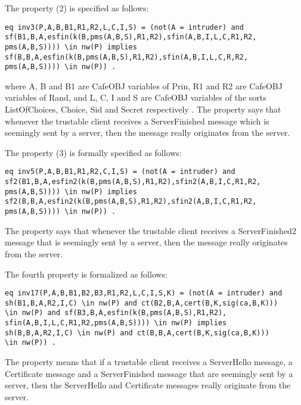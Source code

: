 \documentclass[a4paper,fleqn]{cas-dc}
\begin{document}
The property (2) is specified as follows:
\begin{small}
\begin{verbatim}
eq inv3(P,A,B,B1,R1,R2,L,C,I,S) = (not(A = intruder) and 
sf(B1,B,A,esfin(k(B,pms(A,B,S),R1,R2),sfin(A,B,I,L,C,R1,R2,
pms(A,B,S)))) \in nw(P) implies
sf(B,B,A,esfin(k(B,pms(A,B,S),R1,R2),sfin(A,B,I,L,C,R,R2,
pms(A,B,S)))) \in nw(P)) .
\end{verbatim}
\end{small}
where A, B and B1 are CafeOBJ variables of Prin, R1 and R2 are CafeOBJ variables of Rand, and L, C, I and S are CafeOBJ variables of the sorts ListOfChoices, Choice, Sid and Secret respectively . The property says that whenever the trustable client receives a ServerFinished message which is seemingly sent by a server, then the message really originates from the server. 

The property (3) is formally specified as follows:
\begin{small}
\begin{verbatim}
eq inv5(P,A,B,B1,R1,R2,C,I,S) = (not(A = intruder) and
sf2(B1,B,A,esfin2(k(B,pms(A,B,S),R1,R2),sfin2(A,B,I,C,R1,R2,
pms(A,B,S)))) \in nw(P) implies
sf2(B,B,A,esfin2(k(B,pms(A,B,S),R1,R2),sfin2(A,B,I,C,R1,R2,
pms(A,B,S)))) \in nw(P)) .
\end{verbatim}
\end{small}
The property says that whenever the trustable client receives a ServerFinished2 message that is seemingly sent by a server, then the message really originates from the server.  

The fourth property is formalized as follows:
\begin{small}
\begin{verbatim}
eq inv17(P,A,B,B1,B2,B3,R1,R2,L,C,I,S,K) = (not(A = intruder) and
sh(B1,B,A,R2,I,C) \in nw(P) and ct(B2,B,A,cert(B,K,sig(ca,B,K)))
\in nw(P) and sf(B3,B,A,esfin(k(B,pms(A,B,S),R1,R2),
sfin(A,B,I,L,C,R1,R2,pms(A,B,S)))) \in nw(P) implies
sh(B,B,A,R2,I,C) \in nw(P) and ct(B,B,A,cert(B,K,sig(ca,B,K))) 
\in nw(P)) .
\end{verbatim}
\end{small}
The property means that if a trustable client receives a ServerHello message, a Certificate message and a ServerFinished message that are seemingly sent by a server, then the ServerHello and Certificate messages really originate from the server.
\end{document}
